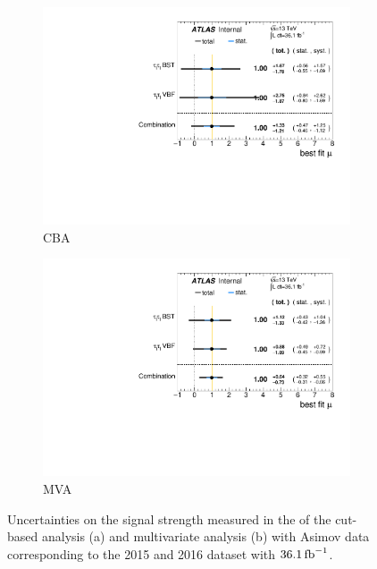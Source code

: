 \begin{figure}[htb]
    \centering
    \begin{subfigure}[t]{0.45\textwidth}
        \includegraphics[width=\textwidth]{./plots/fit/cba/POI.pdf}
        \caption{CBA}
    \end{subfigure}
    \begin{subfigure}[t]{0.45\textwidth}
        \includegraphics[width=\textwidth]{./plots/fit/mva/POI.pdf}
        \caption{MVA}
    \end{subfigure}
    \caption{Uncertainties on the signal strength measured in the of the cut-based analysis (a) and multivariate analysis (b)
             with Asimov data corresponding to the 2015 and 2016 dataset with $\SI{36.1}{\invfb}$.}\label{fig:fit:result:mu}
\end{figure}

